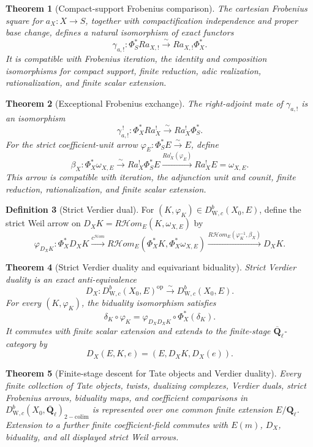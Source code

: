 \documentclass[10pt]{article}
\newtheorem{theorem}{Theorem}[section]
\theoremstyle{definition}
\newtheorem{definition}[theorem]{Definition}
\newcommand{\Ql}{\mathbf Q_\ell}
\newcommand{\Qlb}{\overline{\mathbf Q}_\ell}
\newcommand{\WeilD}{D^b_{\mathrm W,c}}
\newcommand{\RHom}{R\mathcal Hom}
\begin{document}
\begin{theorem}[Compact-support Frobenius comparison]
The cartesian Frobenius square for \(a_X:X\to S\), together with
compactification independence and proper base change, defines a natural
isomorphism of exact functors
\[
 \gamma_{a,!}:\Phi_S^*Ra_{X,!}\xrightarrow{\sim}Ra_{X,!}\Phi_X^*.
\]
It is compatible with Frobenius iteration, the identity and composition
isomorphisms for compact support, finite reduction, adic realization,
rationalization, and finite scalar extension.
\end{theorem}

\begin{theorem}[Exceptional Frobenius exchange]
The right-adjoint mate of \(\gamma_{a,!}\) is an isomorphism
\[
 \gamma_{a,!}^{\,!}:\Phi_X^*Ra_X^!\xrightarrow{\sim}
        Ra_X^!\Phi_{S}^*.
\]
For the strict coefficient-unit arrow
\(\varphi_E:\Phi_S^*E\xrightarrow{\sim}E\), define
\[
 \beta_X:\Phi_X^*\omega_{X,E}
 \xrightarrow{\sim}Ra_X^!\Phi_S^*E
 \xrightarrow{Ra_X^!(\varphi_E)}Ra_X^!E=\omega_{X,E}.
\]
This arrow is compatible with iteration, the adjunction unit and counit,
finite reduction, rationalization, and finite scalar extension.
\end{theorem}

\begin{definition}[Strict Verdier dual]
For \((K,\varphi_K)\in\WeilD(X_0,E)\), define the strict Weil arrow on
\(D_XK=\RHom_E(K,\omega_{X,E})\) by
\[
 \varphi_{D_XK}:\Phi_X^*D_XK
 \xrightarrow{c^{\mathcal Hom}}
 \RHom_E(\Phi_X^*K,\Phi_X^*\omega_{X,E})
 \xrightarrow{\RHom_E(\varphi_K^{-1},\beta_X)}D_XK.
\]
\end{definition}

\begin{theorem}[Strict Verdier duality and equivariant biduality]
Strict Verdier duality is an exact anti-equivalence
\[
 D_X:\WeilD(X_0,E)^{\mathrm{op}}\xrightarrow{\sim}\WeilD(X_0,E).
\]
For every \((K,\varphi_K)\), the biduality isomorphism satisfies
\[
 \delta_K\circ\varphi_K
 =\varphi_{D_XD_XK}\circ\Phi_X^*(\delta_K).
\]
It commutes with finite scalar extension and extends to the finite-stage
\(\Qlb\)-category by
\[
                       D_X(E,K,e)=(E,D_XK,D_X(e)).
\]
\end{theorem}

\begin{theorem}[Finite-stage descent for Tate objects and Verdier duality]
Every finite collection of Tate objects, twists, dualizing complexes,
Verdier duals, strict Frobenius arrows, biduality maps, and coefficient
comparisons in \(\WeilD(X_0,\Qlb)_{\mathrm{2-colim}}\) is represented over
one common finite extension \(E/\Ql\).  Extension to a further finite coefficient-field
commutes with \(E(m)\), \(D_X\), biduality, and all displayed strict Weil
arrows.
\end{theorem}
\end{document}
